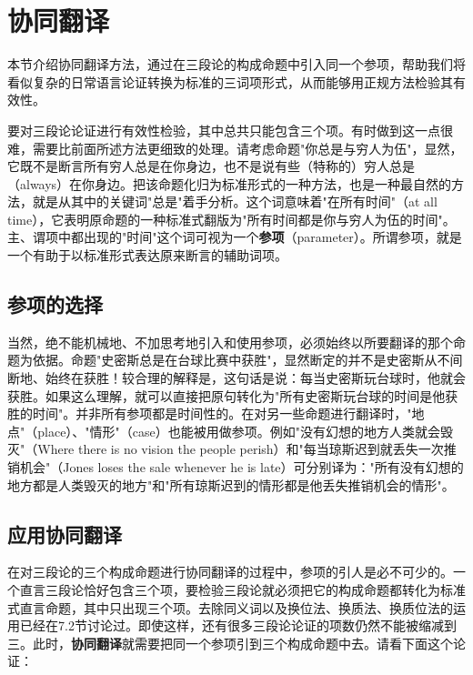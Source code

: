 \section{协同翻译}

\begin{logicbox}[title=引言]
本节介绍协同翻译方法，通过在三段论的构成命题中引入同一个参项，帮助我们将看似复杂的日常语言论证转换为标准的三词项形式，从而能够用正规方法检验其有效性。
\end{logicbox}

要对三段论论证进行有效性检验，其中总共只能包含三个项。有时做到这一点很难，需要比前面所述方法更细致的处理。请考虑命题"你总是与穷人为伍"，显然，它既不是断言所有穷人总是在你身边，也不是说有些（特称的）穷人总是（always）在你身边。把该命题化归为标准形式的一种方法，也是一种最自然的方法，就是从其中的关键词"总是"着手分析。这个词意味着"在所有时间"（at all time），它表明原命题的一种标准式翻版为"所有时间都是你与穷人为伍的时间"。主、谓项中都出现的"时间"这个词可视为一个\textbf{参项}（parameter）。所谓参项，就是一个有助于以标准形式表达原来断言的辅助词项。

\subsection{参项的选择}

当然，绝不能机械地、不加思考地引入和使用参项，必须始终以所要翻译的那个命题为依据。命题"史密斯总是在台球比赛中获胜"，显然断定的并不是史密斯从不间断地、始终在获胜！较合理的解释是，这句话是说：每当史密斯玩台球时，他就会获胜。如果这么理解，就可以直接把原句转化为"所有史密斯玩台球的时间是他获胜的时间"。并非所有参项都是时间性的。在对另一些命题进行翻译时，"地点"（place）、"情形"（case）也能被用做参项。例如"没有幻想的地方人类就会毁灭"（Where there is no vision the people perish）和"每当琼斯迟到就丢失一次推销机会"（Jones loses the sale whenever he is late）可分别译为："所有没有幻想的地方都是人类毁灭的地方"和"所有琼斯迟到的情形都是他丢失推销机会的情形"。

\subsection{应用协同翻译}

在对三段论的三个构成命题进行协同翻译的过程中，参项的引人是必不可少的。一个直言三段论恰好包含三个项，要检验三段论就必须把它的构成命题都转化为标准式直言命题，其中只出现三个项。去除同义词以及换位法、换质法、换质位法的运用已经在7.2节讨论过。即使这样，还有很多三段论论证的项数仍然不能被缩减到三。此时，\textbf{协同翻译}就需要把同一个参项引到三个构成命题中去。请看下面这个论证：

